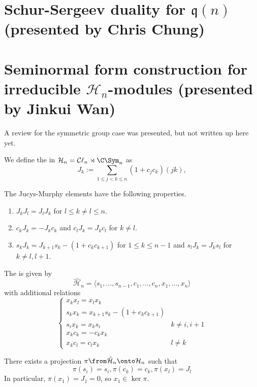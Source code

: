\documentclass[11pt,leqno,oneside]{amsbook}
\renewcommand{\H}{\mathcal{H}}
\newcommand{\Cl}{\mathcal{C\ell}} %
\renewcommand{\q}{\mathfrak{q}}
\numberwithin{thm}{section}
\begin{document}
\section{Schur-Sergeev duality for \(\q(n)\) (presented by Chris Chung)}
\section{Seminormal form construction for irreducible \(\H_n\)-modules
  (presented by Jinkui Wan)}
A review for the symmetric group case was presented, but not written
up here yet.
\begin{defn}
  We define the  in \(\H_n = \Cl_n \rtimes
  \C\Sym_n\) as \[
    J_k := \sum_{1 \leq j < k \leq n} (1+c_j c_k) (jk), 
  \]
\end{defn}
\begin{prop}
  The Jucys-Murphy elements have the following properties.
  \begin{enumerate}
  \item \(J_k J_l = J_l J_k\) for \(l \leq k \neq l \leq n\).
  \item \(c_k J_k = -J_k c_k\) and \(c_l J_k = J_k c_l\) for \(k \neq
    l\).
  \item \(s_k J_k = J_{k+1}s_k - (1+c_k c_{k+1})\) for \(1 \leq k \leq
    n-1\) and \(s_l J_k = J_k s_l\) for \(k \neq l,l+1\).
  \end{enumerate}
\end{prop}
\begin{defn}
  The  is given by \[
    \hat{\H}_n = \langle s_1, \ldots, s_{n-1}, c_1, \ldots, c_n, x_1
    ,\ldots, x_n\rangle
  \]
  with additional relations  \[
    \begin{cases}
      x_k x_l = x_l x_k\\
      s_k x_k = x_{k+1} s_k - (1+c_k c_{k+1})\\
      s_i x_k = x_k s_i & k \neq i,i+1\\
      x_k c_k = - c_k x_k \\
      x_k c_l = c_l x_k & l \neq k
    \end{cases}
  \]
\end{defn}
\begin{prop}
  There exists a projection \(\pi \from \hat{\H}_n \onto \H_n\) such
  that \[
    \pi(s_i) = s_i, \pi(c_k) = c_k, \pi(x_l) = J_l
  \]
  In particular, \(\pi(x_1) = J_1 = 0\), so \(x_1 \in \ker \pi\). 
\end{prop}
\end{document}
